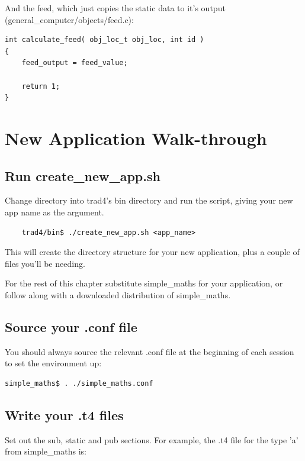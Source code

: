 \documentclass{report}
\begin{document}
And the feed, which just copies the static data to it's output (general_computer/objects/feed.c):

\begin{verbatim}
int calculate_feed( obj_loc_t obj_loc, int id )
{
    feed_output = feed_value;

    return 1;
}
\end{verbatim}









\chapter{New Application Walk-through}

\section{Run create_new_app.sh}

Change directory into trad4's bin directory and run the script, giving your new app name as the argument.

\begin{verbatim}
    trad4/bin$ ./create_new_app.sh <app_name>
\end{verbatim}

This will create the directory structure for your new application, plus a couple of files you'll be needing.

For the rest of this chapter substitute simple_maths for your application, or follow along with a downloaded  distribution of simple_maths.

\section{Source your .conf file}

You should always source the relevant .conf file at the beginning of each session to set the environment  up:

\begin{verbatim}
simple_maths$ . ./simple_maths.conf
\end{verbatim}

\section{Write your .t4 files}

Set out the sub, static and pub sections. For example, the .t4 file for the type 'a' from simple_maths is:
\end{document}
